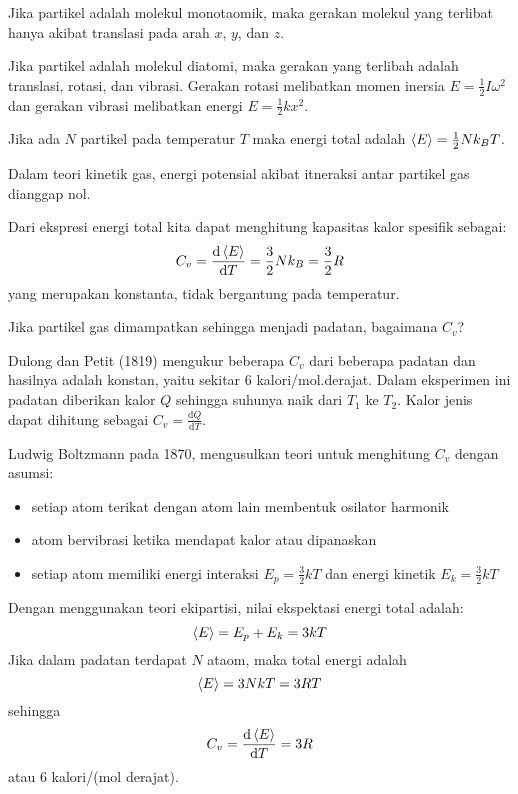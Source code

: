 Jika partikel adalah molekul monotaomik, maka gerakan molekul yang terlibat hanya
akibat translasi pada arah $x$, $y$, dan $z$.

Jika partikel adalah molekul diatomi, maka gerakan yang terlibah adalah translasi, rotasi,
dan vibrasi. Gerakan rotasi melibatkan momen inersia $E = \frac{1}{2} I \omega^2$
dan gerakan vibrasi melibatkan energi $E = \frac{1}{2}kx^2$.

Jika ada $N$ partikel pada temperatur $T$ maka energi total adalah
$\braket{E} = \frac{1}{2}Nk_{B}T$.

Dalam teori kinetik gas, energi potensial akibat itneraksi antar partikel gas dianggap nol.

Dari ekspresi energi total kita dapat menghitung kapasitas kalor spesifik sebagai:
\begin{equation*}
C_{v} = \frac{\mathrm{d}\braket{E}}{\mathrm{d}T} = \frac{3}{2}Nk_{B} = \frac{3}{2}R
\end{equation*}
yang merupakan konstanta, tidak bergantung pada temperatur.

Jika partikel gas dimampatkan sehingga menjadi padatan, bagaimana $C_{v}$?

Dulong dan Petit (1819) mengukur beberapa $C_{v}$ dari beberapa padatan dan hasilnya adalah
konstan, yaitu sekitar 6 kalori/mol.derajat.
Dalam eksperimen ini padatan diberikan kalor $Q$ sehingga suhunya naik dari $T_{1}$ ke $T_{2}$.
Kalor jenis dapat dihitung sebagai $C_{v} = \frac{\mathrm{d}Q}{\mathrm{d}T}$.

Ludwig Boltzmann pada 1870, mengusulkan teori untuk menghitung $C_{v}$ dengan asumsi:
\begin{itemize}
\item setiap atom terikat dengan atom lain membentuk osilator harmonik
\item atom bervibrasi ketika mendapat kalor atau dipanaskan
\item setiap atom memiliki energi interaksi $E_{p} = \frac{3}{2}kT$ dan
energi kinetik $E_{k} = \frac{3}{2}kT$
\end{itemize}
Dengan menggunakan teori ekipartisi, nilai ekspektasi energi total adalah:
\begin{equation*}
\braket{E} = E_{p} + E_{k} = 3kT
\end{equation*}
Jika dalam padatan terdapat $N$ ataom, maka total energi adalah
\begin{equation*}
\braket{E} = 3NkT = 3RT
\end{equation*}
sehingga
\begin{equation*}
C_{v} = \frac{\mathrm{d}\braket{E}}{\mathrm{d}T} = 3R
\end{equation*}
atau 6 kalori/(mol derajat).

